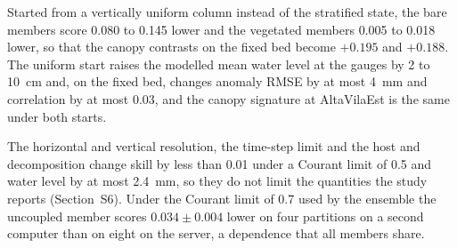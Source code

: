 Started from a vertically uniform column instead of the stratified state, the
bare members score 0.080 to 0.145 lower and the vegetated members 0.005 to
0.018 lower, so that the canopy contrasts on the fixed bed become $+0.195$ and
$+0.188$. The uniform start raises the modelled mean water level at the gauges
by 2 to 10~cm and, on the fixed bed, changes anomaly RMSE by at most 4~mm and
correlation by at most 0.03, and the canopy signature at AltaVilaEst is the same
under both starts.

The horizontal and vertical resolution, the time-step limit and the host and
decomposition change skill by less than 0.01 under a Courant limit of 0.5 and
water level by at most 2.4~mm, so they do not limit the quantities the study
reports (Section~S6). Under the Courant limit of 0.7 used by the ensemble the
uncoupled member scores $0.034 \pm 0.004$ lower on four partitions on a second
computer than on eight on the server, a dependence that all members share.

